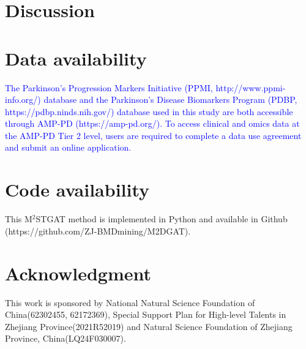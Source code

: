 \documentclass[lettersize,journal]{IEEEtran}
\begin{document}
\section{Discussion}
    

\section{Data availability}

    \textcolor{blue}{The Parkinson’s Progression Markers Initiative (PPMI, http://www.ppmi-info.org/) database and the Parkinson’s Disease Biomarkers Program (PDBP, https://pdbp.ninds.nih.gov/) database used in this study are both accessible through AMP-PD (https://amp-pd.org/). To access clinical and omics data at the AMP-PD Tier 2 level, users are required to complete a data use agreement and submit an online application.}
	

\section*{Code availability}

	This M$^2$STGAT method is implemented in Python and available in Github (https://github.com/ZJ-BMDmining/M2DGAT).


    
\section*{Acknowledgment}

	This work is sponsored by National Natural Science Foundation of China(62302455, 62172369), Special Support Plan for High-level Talents in Zhejiang Province(2021R52019) and Natural Science Foundation of Zhejiang Province, China(LQ24F030007).
	
	







\vfill
\end{document}
